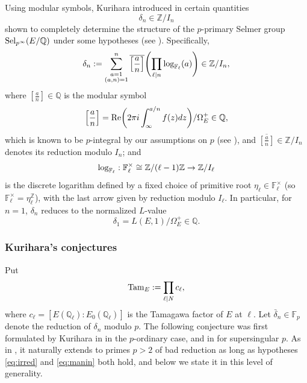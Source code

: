 \documentclass[10pt,reqno]{amsart}
\numberwithin{equation}{section}
\theoremstyle{plain}
\theoremstyle{definition}
\theoremstyle{definition}
\theoremstyle{plain}
\theoremstyle{plain}
\theoremstyle{plain}
\theoremstyle{plain}
\theoremstyle{plain}
\theoremstyle{plain}
\newcommand{\Z}{\mathbb{Z}}
\newcommand{\Q}{\mathbb{Q}}
\begin{document}
Using modular symbols, %
Kurihara  introduced in \cite{kurihara-munster}  certain quantities 
\[
\delta_n\in\Z/I_n
\]
shown to completely determine the structure of the $p$-primary Selmer group ${\rm Sel}_{p^\infty}(E/\Q)$ under some hypotheses   %
(see \cite[Thm.~B]{kurihara-munster}). Specifically,  
\[
\delta_n:=\sum_{\substack{a=1\\(a,n)=1}}^n\overline{\left[\frac{a}{n}\right]}\Biggl(\prod_{\ell\mid n}{\rm log}_{\mathbb{F}_\ell}(a)\Biggr)\in \Z/I_n,
\]
where $\left[\frac{a}{n}\right]\in\Q$ is the modular symbol
\[
\left[\frac{a}{n}\right]={\rm Re}\biggl(2\pi i\int_{\infty}^{a/n}f(z)dz\biggr)/\Omega_E^+\in\Q,
\]
which is known to be $p$-integral by our assumptions on $p$ %
(see \cite[\S{3}]{stevens}), 
and $\overline{\left[\frac{a}{n}\right]}\in\Z/I_n$ denotes its reduction modulo $I_n$; and 
\[
{\rm log}_{\mathbb{F}_\ell}:\mathbb{F}_\ell^\times\cong\Z/(\ell-1)\Z\rightarrow\Z/I_\ell
\]
is the discrete logarithm defined by a fixed choice of primitive root $\eta_\ell\in\mathbb{F}_\ell^\times$ (so $\mathbb{F}_\ell^\times=\eta_\ell^{\Z}$), with the last arrow given by reduction modulo $I_\ell$. In particular, for $n=1$, $\delta_n$ reduces to the normalized $L$-value 
\begin{equation}\label{eq:delta-1}
\delta_1=L(E,1)/\Omega_E^+%
\in\Q.
\end{equation}

\subsubsection{Kurihara's conjectures}\label{subsec:Kurihara}

Put
\[
{\rm Tam}_E:=\prod_{\ell\mid N}c_\ell,
\]
where $c_\ell=[E(\Q_\ell):E_0(\Q_\ell)]$ is the Tamagawa factor of $E$ at $\ell$. Let $\bar{\delta}_n\in\mathbb{F}_p$ denote the reduction of $\delta_n$ modulo $p$. The following conjecture was first  formulated by Kurihara in \cite[\S{1.2}, Conj.~1]{kurihara-iwasawa2012} in the $p$-ordinary case, and in  \cite[\S{1.2}, Conj.~1.1]{kurihara-TATA} for supersingular  $p$. As in \cite{kim}, it naturally extends to primes $p>2$  of bad reduction as long as hypotheses \eqref{eq:irred} and \eqref{eq:manin} both hold, and below we state it in this level of generality. 
\end{document}
